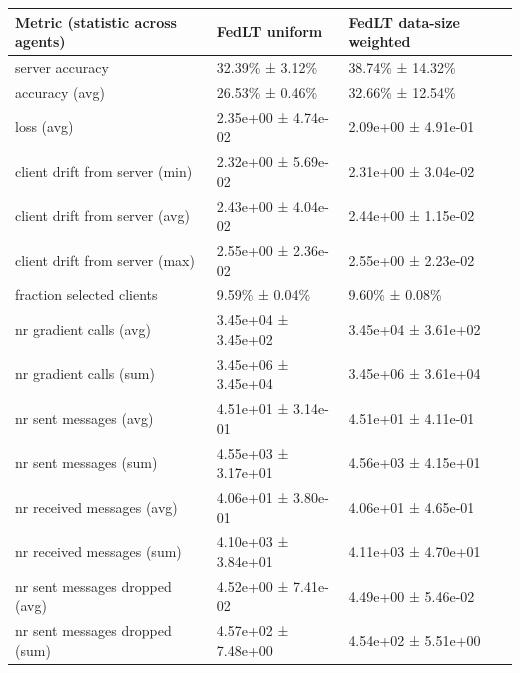 \begin{tabular}{lll}
\hline
 Metric (statistic across agents)   & FedLT uniform       & FedLT data-size weighted   \\
\hline
 server accuracy                    & 32.39\% ± 3.12\%      & 38.74\% ± 14.32\%            \\
 accuracy (avg)                     & 26.53\% ± 0.46\%      & 32.66\% ± 12.54\%            \\
 loss (avg)                         & 2.35e+00 ± 4.74e-02 & 2.09e+00 ± 4.91e-01        \\
 client drift from server (min)     & 2.32e+00 ± 5.69e-02 & 2.31e+00 ± 3.04e-02        \\
 client drift from server (avg)     & 2.43e+00 ± 4.04e-02 & 2.44e+00 ± 1.15e-02        \\
 client drift from server (max)     & 2.55e+00 ± 2.36e-02 & 2.55e+00 ± 2.23e-02        \\
 fraction selected clients          & 9.59\% ± 0.04\%       & 9.60\% ± 0.08\%              \\
 nr gradient calls (avg)            & 3.45e+04 ± 3.45e+02 & 3.45e+04 ± 3.61e+02        \\
 nr gradient calls (sum)            & 3.45e+06 ± 3.45e+04 & 3.45e+06 ± 3.61e+04        \\
 nr sent messages (avg)             & 4.51e+01 ± 3.14e-01 & 4.51e+01 ± 4.11e-01        \\
 nr sent messages (sum)             & 4.55e+03 ± 3.17e+01 & 4.56e+03 ± 4.15e+01        \\
 nr received messages (avg)         & 4.06e+01 ± 3.80e-01 & 4.06e+01 ± 4.65e-01        \\
 nr received messages (sum)         & 4.10e+03 ± 3.84e+01 & 4.11e+03 ± 4.70e+01        \\
 nr sent messages dropped (avg)     & 4.52e+00 ± 7.41e-02 & 4.49e+00 ± 5.46e-02        \\
 nr sent messages dropped (sum)     & 4.57e+02 ± 7.48e+00 & 4.54e+02 ± 5.51e+00        \\
\hline
\end{tabular}